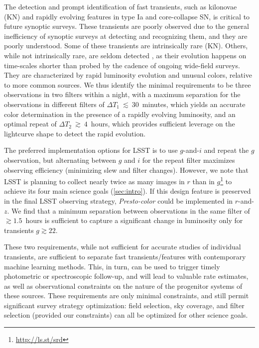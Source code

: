 \documentclass[letterpaper,longauthor,trackchanges,twocolumn,onecolappendix,sort&compress]{aastex62}
\newcommand{\dtone}{\ensuremath{\Delta T_1}}
\newcommand{\dttwo}{\ensuremath{\Delta T_2}}
\begin{document}
The detection and prompt identification of fast transients, such as kilonovae (KN) and rapidly evolving features in type Ia and core-collapse SN, is critical to future synoptic surveys. These transients are poorly observed due to the general inefficiency of synoptic surveys at detecting and recognizing them, and they are poorly understood. Some of these transients are intrinsically rare (KN). Others, while not intrinsically rare, are seldom detected \citep{Drout2014}, as their evolution happens on time-scales shorter than probed by the cadence of ongoing wide-field surveys. They are characterized by rapid luminosity evolution and unusual colors, relative to more common sources. We thus identify the minimal requirements to be three observations in two filters within a night, with a maximum separation for the observations in different filters of $\dtone~\lesssim~ 30$~minutes, which yields an accurate color determination in the presence of a rapidly evolving luminosity, and an optimal repeat of $\dttwo~\gtrsim~ 4$~hours, which provides sufficient leverage on the lightcurve shape to detect the rapid evolution.  

The preferred implementation options for LSST is to use $g$-and-$i$ and repeat the $g$ observation, but alternating between $g$ and $i$ for the repeat filter maximizes observing efficiency (minimizing slew and filter changes). However, we note that LSST is planning to collect nearly twice as many images in $r$ than in $g$\footnote{\url{http://ls.st/srd}} to achieve its four main science goals (\autoref{sec:intro}). If this design feature is preserved in the final LSST observing strategy, {\em Presto-color} could be implemented in  $r$-and-$z$. 
We find that a minimum separation between observations in the same filter of $\gtrsim 1.5$~hours is sufficient to capture a significant change in luminosity only for transients $g\gtrsim22$. 

These two requirements, while not sufficient for accurate studies of individual transients, are sufficient to separate fast transients/features with contemporary machine learning methods. This, in turn, can be used to trigger timely photometric or spectroscopic follow-up, and will lead to valuable rate estimates, as well as observational constraints on the nature of the progenitor systems of these sources. These requirements are only minimal constraints, and still permit significant survey strategy optimization: field selection, sky coverage, and filter selection (provided our constraints) can all be optimized for other science goals.
\end{document}
